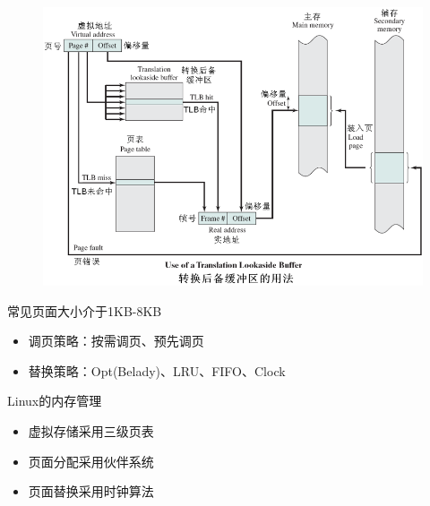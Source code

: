 \begin{figure}[H]
    \centering
    \includegraphics[width=0.8\linewidth]{fig/TLB.png}
\end{figure}

常见页面大小介于1KB-8KB

\begin{itemize}
    \item 调页策略：按需调页、预先调页
    \item 替换策略：Opt(Belady)、LRU、FIFO、Clock
\end{itemize}

Linux的内存管理
\begin{itemize}
    \item 虚拟存储采用三级页表
    \item 页面分配采用伙伴系统
    \item 页面替换采用时钟算法
\end{itemize}